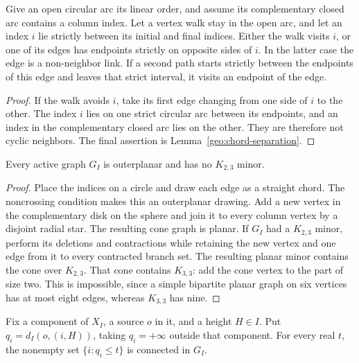 \begin{lemma}\label{geo:skipping}
Give an open circular arc its linear order, and assume its complementary
closed arc contains a column index.  Let a vertex walk stay in the open
arc, and let an index $i$ lie strictly between its initial and final indices.
Either the walk visits $i$, or one of its edges has endpoints strictly on
opposite sides of $i$.  In the latter case the edge is a non-neighbor link.
If a second path starts strictly between the endpoints of this edge and
leaves that strict interval, it visits an endpoint of the edge.
\end{lemma}

\begin{proof}
If the walk avoids $i$, take its first edge changing from one side of $i$
to the other.  The index $i$ lies on one strict circular arc between its
endpoints, and an index in the complementary closed arc lies on the other.
They are therefore not cyclic neighbors.  The final assertion is
Lemma~\ref{geo:chord-separation}.
\end{proof}

\begin{lemma}[Outerplanarity]\label{geo:outerplanar}
Every active graph $G_I$ is outerplanar and has no $K_{2,3}$ minor.
\end{lemma}

\begin{proof}
Place the indices on a circle and draw each edge as a straight chord.
The noncrossing condition makes this an outerplanar drawing.  Add a new
vertex in the complementary disk on the sphere and join it to every
column vertex by a disjoint radial star.  The resulting cone graph is
planar.  If $G_I$ had a $K_{2,3}$ minor, perform its deletions and contractions
while retaining the new vertex and one edge from it to every contracted
branch set.  The resulting planar minor contains the cone over $K_{2,3}$.
That cone contains $K_{3,3}$: add the cone vertex to the part of size two.
This is impossible, since a simple bipartite planar graph on six vertices
has at most eight edges, whereas $K_{3,3}$ has nine.
\end{proof}

\begin{lemma}\label{geo:sublevel}
Fix a component of $X_I$, a source $o$ in it, and a height $H\in I$.
Put $q_i=d_I(o,(i,H))$, taking $q_i=+\infty$ outside that component.
For every real $t$, the nonempty set $\{i:q_i\le t\}$ is connected in
$G_I$.
\end{lemma}

